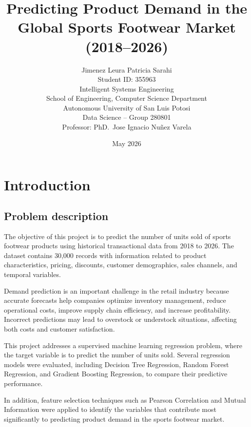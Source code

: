 \documentclass[12pt]{article}
\title{\textbf{Predicting Product Demand in the Global Sports Footwear Market (2018--2026)}}
\author{
Jimenez Leura Patricia Sarahi \\
Student ID: 355963 \\
Intelligent Systems Engineering \\
School of Engineering, Computer Science Department \\
Autonomous University of San Luis Potosi \\
Data Science -- Group 280801 \\
Professor: PhD.\ Jose Ignacio Nuñez Varela
}
\date{May 2026}
\begin{document}
\maketitle
\thispagestyle{empty}   %
\newpage

\section{Introduction}

\subsection{Problem description}

The objective of this project is to predict the number of units sold of sports footwear products using historical transactional data from 2018 to 2026. The dataset contains 30,000 records with information related to product characteristics, pricing, discounts, customer demographics, sales channels, and temporal variables.

Demand prediction is an important challenge in the retail industry because accurate forecasts help companies optimize inventory management, reduce operational costs, improve supply chain efficiency, and increase profitability. Incorrect predictions may lead to overstock or understock situations, affecting both costs and customer satisfaction.

This project addresses a supervised machine learning regression problem, where the target variable is to predict the number of units sold. Several regression models were evaluated, including Decision Tree Regression, Random Forest Regression, and Gradient Boosting Regression, to compare their predictive performance.

In addition, feature selection techniques such as Pearson Correlation and Mutual Information were applied to identify the variables that contribute most significantly to predicting product demand in the sports footwear market.

\end{document}
